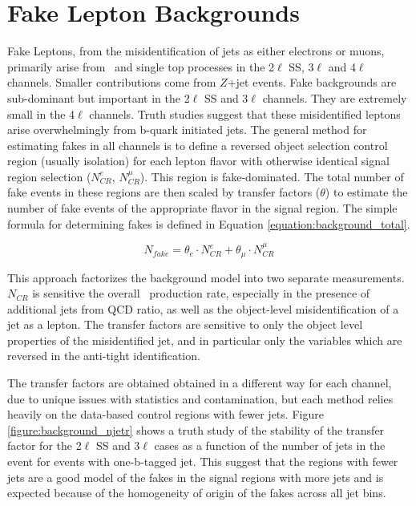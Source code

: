 \section{Fake Lepton Backgrounds}
\label{section:fakes}
Fake Leptons, from the misidentification of jets as either electrons or muons, primarily arise from \ttbar\ and single top processes in the 2$\ell$ SS, 3$\ell$ and 4$\ell$ channels. Smaller contributions come from $Z$+jet events. Fake backgrounds are sub-dominant but important in the 2$\ell$ SS and 3$\ell$ channels. They are extremely small in the 4$\ell$ channels. Truth studies suggest that these misidentified leptons arise overwhelmingly from b-quark initiated jets. The general method for estimating fakes in all channels is to define a reversed object selection control region (usually isolation) for each lepton flavor with otherwise identical signal region selection ($N^e_{CR}$, $N^{\mu}_{CR}$). This region is fake-dominated. The total number of fake events in these regions are then scaled by transfer factors ($\theta$) to estimate the number of fake events of the appropriate flavor in the signal region. The simple formula for determining fakes is defined in Equation \ref{equation:background_total}.    


\begin{equation}
N_{fake} = \theta_e \cdot N^e_{CR} + \theta_{\mu} \cdot N^{\mu}_{CR}   
\label{equation:background_total}
\end{equation}

This approach factorizes the background model into two separate measurements. $N_{CR}$ is sensitive the overall \ttbar\ production rate, especially in the presence of additional jets from QCD ratio, as well as the object-level misidentification of a jet as a lepton. The transfer factors are sensitive to only the object level properties of the misidentified jet, and in particular only the variables which are reversed in the anti-tight identification. 

The transfer factors are obtained obtained in a different way for each channel, due to unique issues with statistics and contamination, but each method relies heavily on the data-based control regions with fewer jets. Figure \ref{figure:background_njetr} shows a truth study of the stability of the transfer factor for the 2$\ell$ SS and 3$\ell$ cases as a function of the number of jets in the event for events with one-b-tagged jet. This suggest that the regions with fewer jets are a good model of the fakes in the signal regions with more jets and is expected because of the homogeneity of origin of the fakes across all jet bins.  

